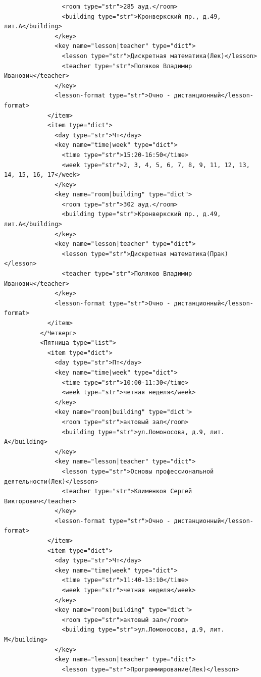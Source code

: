 \documentclass[12pt,onecolumn]{article}
\begin{document}
\begin{flushleft}
\begin{verbatim}
                <room type="str">285 ауд.</room>
                <building type="str">Кронверкский пр., д.49, лит.А</building>
              </key>
              <key name="lesson|teacher" type="dict">
                <lesson type="str">Дискретная математика(Лек)</lesson>
                <teacher type="str">Поляков Владимир Иванович</teacher>
              </key>
              <lesson-format type="str">Очно - дистанционный</lesson-format>
            </item>
            <item type="dict">
              <day type="str">Чт</day>
              <key name="time|week" type="dict">
                <time type="str">15:20-16:50</time>
                <week type="str">2, 3, 4, 5, 6, 7, 8, 9, 11, 12, 13, 14, 15, 16, 17</week>
              </key>
              <key name="room|building" type="dict">
                <room type="str">302 ауд.</room>
                <building type="str">Кронверкский пр., д.49, лит.А</building>
              </key>
              <key name="lesson|teacher" type="dict">
                <lesson type="str">Дискретная математика(Прак)</lesson>
                <teacher type="str">Поляков Владимир Иванович</teacher>
              </key>
              <lesson-format type="str">Очно - дистанционный</lesson-format>
            </item>
          </Четверг>
          <Пятница type="list">
            <item type="dict">
              <day type="str">Пт</day>
              <key name="time|week" type="dict">
                <time type="str">10:00-11:30</time>
                <week type="str">четная неделя</week>
              </key>
              <key name="room|building" type="dict">
                <room type="str">актовый зал</room>
                <building type="str">ул.Ломоносова, д.9, лит. А</building>
              </key>
              <key name="lesson|teacher" type="dict">
                <lesson type="str">Основы профессиональной деятельности(Лек)</lesson>
                <teacher type="str">Клименков Сергей Викторович</teacher>
              </key>
              <lesson-format type="str">Очно - дистанционный</lesson-format>
            </item>
            <item type="dict">
              <day type="str">Чт</day>
              <key name="time|week" type="dict">
                <time type="str">11:40-13:10</time>
                <week type="str">четная неделя</week>
              </key>
              <key name="room|building" type="dict">
                <room type="str">актовый зал</room>
                <building type="str">ул.Ломоносова, д.9, лит. М</building>
              </key>
              <key name="lesson|teacher" type="dict">
                <lesson type="str">Программирование(Лек)</lesson>

\end{verbatim}
\end{flushleft}
\end{document}
